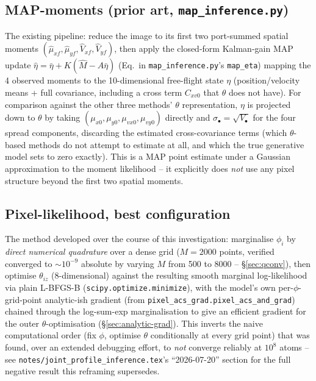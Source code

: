 \documentclass[11pt,a4paper]{article}
\newcommand{\code}[1]{\texttt{#1}}
\begin{document}
\subsection{MAP-moments (prior art, \code{map\_inference.py})}
\label{sec:map-moments}
The existing pipeline: reduce the image to its first two port-summed
spatial moments $(\hat\mu_{xf},\hat\mu_{yf},\hat V_{xf},\hat V_{yf})$, then
apply the closed-form Kalman-gain MAP update
$\hat\eta = \bar\eta + K(\hat M - A\bar\eta)$ (Eq.\ in
\code{map\_inference.py}'s \code{map\_eta}) mapping the 4 observed moments
to the 10-dimensional free-flight state $\eta$ (position/velocity means +
full covariance, including a cross term $C_{xv0}$ that $\theta$ does not
have). For comparison against the other three methods' $\theta$
representation, $\eta$ is projected down to $\theta$ by taking
$(\mu_{x0},\mu_{y0},\mu_{vx0},\mu_{vy0})$ directly and
$\sigma_\bullet=\sqrt{V_\bullet}$ for the four spread components, discarding
the estimated cross-covariance terms (which $\theta$-based methods do not
attempt to estimate at all, and which the true generative model sets to
zero exactly). This is a MAP point estimate under a Gaussian
approximation to the moment likelihood -- it explicitly does \emph{not} use
any pixel structure beyond the first two spatial moments.

\subsection{Pixel-likelihood, best configuration}
\label{sec:phi-marginal-method}
The method developed over the course of this investigation: marginalise
$\phi_i$ by \emph{direct numerical quadrature} over a dense grid
($M=2000$ points, verified converged to $\sim10^{-9}$ absolute by varying
$M$ from 500 to 8000 -- \S\ref{sec:qconv}), then optimise $\theta_{iz}$
(8-dimensional) against the resulting smooth marginal log-likelihood via
plain L-BFGS-B (\code{scipy.optimize.minimize}), with the model's own
per-$\phi$-grid-point analytic-ish gradient (from
\code{pixel\_acs\_grad.pixel\_acs\_and\_grad}) chained through the
log-sum-exp marginalisation to give an efficient gradient for the outer
$\theta$-optimisation (\S\ref{sec:analytic-grad}). This inverts the naive
computational order (fix $\phi$, optimise $\theta$ conditionally at every
grid point) that was found, over an extended debugging effort, to
\emph{not} converge reliably at $10^8$ atoms -- see
\code{notes/joint\_profile\_inference.tex}'s ``2026-07-20'' section for the
full negative result this reframing supersedes.
\end{document}
